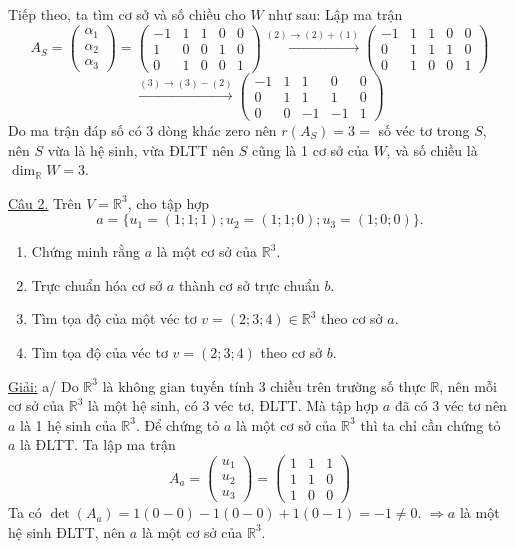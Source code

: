 \documentclass[12pt,a4paper]{article}
\newcommand{\R}{\mathbb{R}}
\begin{document}
Tiếp theo, ta tìm cơ sở và số chiều cho $W$ như sau:
Lập ma trận
\[
A_S = \begin{pmatrix} \alpha_1 \\ \alpha_2 \\ \alpha_3 \end{pmatrix} = \begin{pmatrix} -1 & 1 & 1 & 0 & 0 \\ 1 & 0 & 0 & 1 & 0 \\ 0 & 1 & 0 & 0 & 1 \end{pmatrix} 
\xrightarrow{(2) \to (2) + (1)} \begin{pmatrix} -1 & 1 & 1 & 0 & 0 \\ 0 & 1 & 1 & 1 & 0 \\ 0 & 1 & 0 & 0 & 1 \end{pmatrix} 
\]
\[
\xrightarrow{(3) \to (3) - (2)} \begin{pmatrix} -1 & 1 & 1 & 0 & 0 \\ 0 & 1 & 1 & 1 & 0 \\ 0 & 0 & -1 & -1 & 1 \end{pmatrix}
\]
Do ma trận đáp số có 3 dòng khác zero nên $r(A_S) = 3 = $ số véc tơ trong $S$, nên $S$ vừa là hệ sinh, vừa ĐLTT nên $S$ cũng là 1 cơ sở của $W$, và số chiều là $\dim_{\R} W = 3$.

\vspace{0.5cm}

\underline{Câu 2.} Trên $V=\R^3$, cho tập hợp
\[
a=\{u_1=(1; 1; 1); u_2=(1; 1; 0); u_3=(1; 0; 0)\}.
\]
\begin{enumerate}[label=\alph*/]
\item Chứng minh rằng $a$ là một cơ sở của $\R^3$.
\item Trực chuẩn hóa cơ sở $a$ thành cơ sở trực chuẩn $b$.
\item Tìm tọa độ của một véc tơ $v=(2; 3; 4) \in \R^3$ theo cơ sở $a$.
\item Tìm tọa độ của véc tơ $v=(2; 3; 4)$ theo cơ sở $b$.
\end{enumerate}

\underline{Giải:}
a/ Do $\R^3$ là không gian tuyến tính 3 chiều trên trường số thực $\R$, nên mỗi cơ sở của $\R^3$ là một hệ sinh, có 3 véc tơ, ĐLTT. Mà tập hợp $a$ đã có 3 véc tơ nên $a$ là 1 hệ sinh của $\R^3$. Để chứng tỏ $a$ là một cơ sở của $\R^3$ thì ta chỉ cần chứng tỏ $a$ là ĐLTT.
Ta lập ma trận
\[
A_a = \begin{pmatrix} u_1 \\ u_2 \\ u_3 \end{pmatrix} = \begin{pmatrix} 1 & 1 & 1 \\ 1 & 1 & 0 \\ 1 & 0 & 0 \end{pmatrix}
\]
Ta có $\det(A_a) = 1(0 - 0) - 1(0 - 0) + 1(0 - 1) = -1 \neq 0$.
$\Rightarrow a$ là một hệ sinh ĐLTT, nên $a$ là một cơ sở của $\R^3$.
\end{document}
